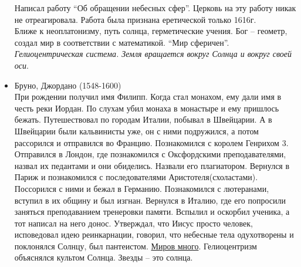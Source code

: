 \documentclass[a4paper,12pt]{report} %
\begin{document}
\begin{itemize}
  Написал работу ``Об обращении небесных сфер''. Церковь на эту работу
  никак не отреагировала. Работа была признана еретической только
  1616г.\\
  Ближе к неоплатонизму, путь солнца, герметические учения. Бог --
  геометр, создал мир в соответствии с математикой. ``Мир
  сферичен''. \textit{Гелиоцентрическая система. Земля вращается вокруг Солнца и
    вокруг своей оси}.
\item Бруно, Джордано (1548-1600)\\
  При рождении получил имя Филипп. Когда стал монахом, ему дали имя в
  честь реки Иордан. По слухам убил монаха в монастыре и ему пришлось
  бежать. Путешествовал по городам Италии, побывал в Швейцарии. А в
  Швейцарии были кальвинисты уже, он с ними подружился, а потом
  рассорился и отправился во Францию. Познакомился с королем Генрихом
  3. Отправился в Лондон, где познакомился с Оксфордскими
  преподавателями, назвал их педантами и они обиделись. Назвали его
  плагиатором. Вернулся в Париж и познакомился с последователями
  Аристотеля(схоластами). Поссорился с ними и бежал в
  Германию. Познакомился с лютеранами, вступил в их общину и был
  изгнан. Вернулся в Италию, где его попросили заняться преподаванием
  тренеровки памяти. Вспылил и оскорбил ученика, а тот написал на него
  донос. Утверждал, что Иисус просто человек, исповедовал идею
  реинкарнации, говорил, что небесные тела одухотворены и поклонялся
  Солнцу, был пантеистом. \underline{Миров много}. Гелиоцентризм объяснялся
  культом Солнца. Звезды -- это солнца.


\end{itemize}
\end{document}
